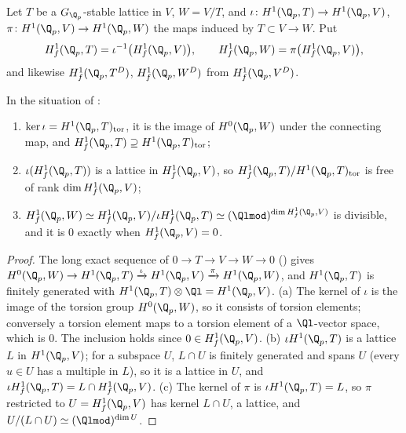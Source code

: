 \begin{definition}[propagation]\label{def:blochkato:propagation}
\sloppy Let $T$ be a $G_{\Q_p}$-stable lattice in $V$, $W=V/T$, and $\iota\colon H^1(\Q_p,T)\to H^1(\Q_p,V)$, $\pi\colon H^1(\Q_p,V)\to H^1(\Q_p,W)$ the maps induced by
$T\subset V\to W$. Put
\[
H^1_f(\Q_p,T)=\iota^{-1}\bigl(H^1_f(\Q_p,V)\bigr),\qquad H^1_f(\Q_p,W)=\pi\bigl(H^1_f(\Q_p,V)\bigr),
\]
and likewise $H^1_f(\Q_p,T^D)$, $H^1_f(\Q_p,W^D)$ from $H^1_f(\Q_p,V^D)$.
\end{definition}

\begin{proposition}\label{prop:blochkato:propagation}
In the situation of :
\begin{enumerate}[label=(\alph*)]
\item $\ker\iota=H^1(\Q_p,T)_{\mathrm{tor}}$, it is the image of $H^0(\Q_p,W)$ under the connecting map, and $H^1_f(\Q_p,T)\supseteq H^1(\Q_p,T)_{\mathrm{tor}}$;
\item \sloppy $\iota(H^1_f(\Q_p,T))$ is a lattice in $H^1_f(\Q_p,V)$, so $H^1_f(\Q_p,T)/H^1(\Q_p,T)_{\mathrm{tor}}$ is free of rank $\dim H^1_f(\Q_p,V)$;
\item $H^1_f(\Q_p,W)\simeq H^1_f(\Q_p,V)/\iota H^1_f(\Q_p,T)\simeq(\Qlmod)^{\dim H^1_f(\Q_p,V)}$ is divisible, and it is $0$ exactly when $H^1_f(\Q_p,V)=0$.
\end{enumerate}
\end{proposition}

\begin{proof}
The long exact sequence of $0\to T\to V\to W\to0$ () gives $H^0(\Q_p,W)\to H^1(\Q_p,T)\xrightarrow{\iota}H^1(\Q_p,V)\xrightarrow{\pi}H^1(\Q_p,W)$, and $H^1(\Q_p,T)$ is
finitely generated with $H^1(\Q_p,T)\otimes\Ql=H^1(\Q_p,V)$. (a) The kernel of $\iota$ is the image of the torsion group $H^0(\Q_p,W)$, so it consists of torsion
elements; conversely a torsion element maps to a torsion element of a $\Ql$-vector space, which is $0$. The inclusion holds since $0\in H^1_f(\Q_p,V)$. (b) $\iota H^1(\Q_p,T)$ is a
lattice $L$ in $H^1(\Q_p,V)$; for a subspace $U$, $L\cap U$ is finitely generated and spans $U$ (every $u\in U$ has a multiple in $L$), so it is a lattice in $U$, and
$\iota H^1_f(\Q_p,T)=L\cap H^1_f(\Q_p,V)$. (c) The kernel of $\pi$ is $\iota H^1(\Q_p,T)=L$, so $\pi$ restricted to $U=H^1_f(\Q_p,V)$ has kernel $L\cap U$, a lattice, and
$U/(L\cap U)\simeq(\Qlmod)^{\dim U}$.
\end{proof}

